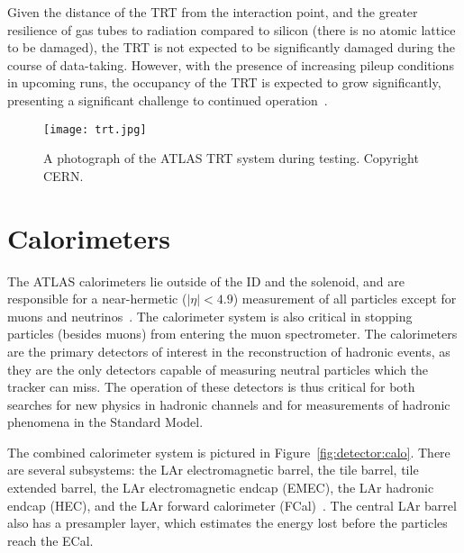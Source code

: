 Given the distance of the TRT from the interaction point, and the greater resilience of gas tubes to radiation compared to silicon (there is no atomic lattice to be damaged), the TRT is not expected to be significantly damaged during the course of data-taking. However, with the presence of increasing pileup conditions in upcoming runs, the occupancy of the TRT is expected to grow significantly, presenting a significant challenge to continued operation~\cite{TRTOccupancy}.


\begin{figure}
\centering
\texttt{[image: trt.jpg]}
\caption{A photograph of the ATLAS TRT system during testing. Copyright CERN.}
\label{fig:detector:trt}
\end{figure}


\section{Calorimeters}

The ATLAS calorimeters lie outside of the ID and the solenoid, and are responsible for a near-hermetic ($|\eta| < 4.9$) measurement of all particles except for muons and neutrinos~\cite{ATLASPaper}.  The calorimeter system is also critical in stopping particles (besides muons) from entering the muon spectrometer. The calorimeters are the primary detectors of interest in the reconstruction of hadronic events, as they are the only detectors capable of measuring neutral particles which the tracker can miss. The operation of these detectors is thus critical for both searches for new physics in hadronic channels and for measurements of hadronic phenomena in the Standard Model.

The combined calorimeter system is pictured in Figure~\ref{fig:detector:calo}. There are several subsystems: the LAr electromagnetic barrel, the tile barrel, tile extended barrel, the LAr electromagnetic endcap (EMEC), the LAr hadronic endcap (HEC), and the LAr forward calorimeter (FCal)~\cite{ATLASPaper}. The central LAr barrel also has a presampler layer, which estimates the energy lost before the particles reach the ECal.

